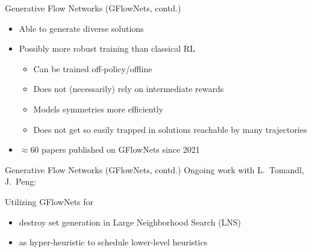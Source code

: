 \documentclass[aspectratio=1610]{beamer}
\newcommand{\important}[1]{{\color{green!60!black}#1}}
\begin{document}
\begin{frame}{Generative Flow Networks (GFlowNets, contd.)}
	\bigskip
		\begin{itemize}
			\itemsep2ex
			\item Able to generate \important{diverse} solutions
			\item Possibly \important{more robust training} than classical RL
			\begin{itemize}
				\item Can be trained off-policy/offline
				\item Does not (necessarily) rely on intermediate rewards
				\item Models symmetries more efficiently
				\item Does not get so easily trapped in solutions reachable by many trajectories
			\end{itemize}
			\item $\approx 60$ papers published on GFlowNets since 2021
		\end{itemize}
	\end{frame}
	
	\begin{frame}{Generative Flow Networks (GFlowNets, contd.)}
	Ongoing work with L.~Tomandl, J.~Peng:
	
	\bigskip
	Utilizing GFlowNets for
	
	\medskip
	\begin{itemize}
		\itemsep2ex
		\item destroy set generation in Large Neighborhood Search (LNS)
		\item as hyper-heuristic to schedule lower-level heuristics
	\end{itemize}
\end{frame}


	
\end{document}
